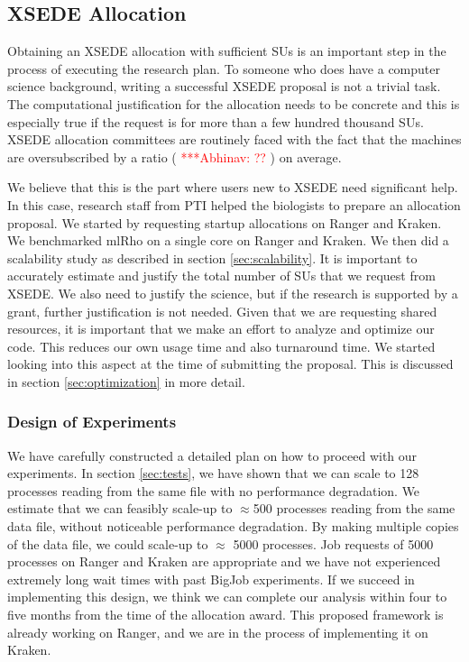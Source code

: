 \documentclass{sig-alternate}
\newcommand{\abhi}[1]{ {\textcolor{red} { ***Abhinav: #1 }}}
\newcommand{\abhi}[1]{ {}}
\begin{document}
\subsection{XSEDE Allocation}

Obtaining an XSEDE allocation with sufficient SUs is an important step in the process of executing the research plan. To someone who does have a computer science background, writing a successful XSEDE proposal is not a trivial task. The computational justification for the allocation needs to be concrete and this is especially true if the request is for more than a few hundred thousand SUs. XSEDE allocation committees are routinely faced with the fact that the machines are oversubscribed by a ratio (\abhi{??}) on average. 

We believe that this is the part where users new to XSEDE need significant help. In this case, research staff from PTI helped the biologists to prepare an allocation proposal. We started by requesting startup allocations on Ranger and Kraken. We benchmarked mlRho on a single core on Ranger and Kraken. We then did a scalability study as described in section \ref{sec:scalability}. It is important to accurately estimate and justify the total number of SUs that we request from XSEDE.  We also need to justify the science, but if the research is supported by a grant, further justification is not needed. Given that we are requesting shared resources, it is important that we make an effort to analyze and optimize our code. This reduces our own usage time and also turnaround time. We started looking into this aspect at the time of submitting the proposal. This is discussed in section \ref{sec:optimization} in more detail. 


\subsubsection{Design of Experiments}

We have carefully constructed a detailed plan on how to proceed with our experiments. In section \ref{sec:tests}, we have shown that we can scale to 128 processes reading from the same file with no performance degradation. We estimate that we can feasibly scale-up to $\approx$500 processes reading from the same data file, without noticeable performance degradation. By making multiple copies of the data file, we could scale-up to $\approx$ 5000 processes. Job requests of 5000 processes on Ranger and Kraken are appropriate and we have not experienced extremely long wait times with past BigJob experiments. If we succeed in implementing this design, we think we can complete our analysis within four to five months from the time of the allocation award. This proposed framework is already working on Ranger, and we are in the process of implementing it on Kraken. 
\end{document}

